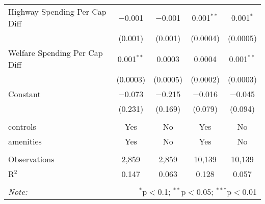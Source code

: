\begin{table}[!htbp]
\begin{tabular}{@{\extracolsep{5pt}}lcccc}
  Highway Spending Per Cap Diff & $-$0.001 & $-$0.001 & 0.001$^{**}$ & 0.001$^{*}$ \\ 
  & (0.001) & (0.001) & (0.0004) & (0.0005) \\ 
  Welfare Spending Per Cap Diff & 0.001$^{**}$ & 0.0003 & 0.0004 & 0.001$^{**}$ \\ 
  & (0.0003) & (0.0005) & (0.0002) & (0.0003) \\ 
  Constant & $-$0.073 & $-$0.215 & $-$0.016 & $-$0.045 \\ 
  & (0.231) & (0.169) & (0.079) & (0.094) \\ 
 \hline \\[-1.8ex] 
controls & Yes & No & Yes & No \\ 
amenities & Yes & No & Yes & No \\ 
\hline \\[-1.8ex] 
Observations & 2,859 & 2,859 & 10,139 & 10,139 \\ 
R$^{2}$ & 0.147 & 0.063 & 0.128 & 0.057 \\ 
\hline 
\hline \\[-1.8ex] 
\textit{Note:}  & \multicolumn{4}{r}{$^{*}$p$<$0.1; $^{**}$p$<$0.05; $^{***}$p$<$0.01} \\ 
\end{tabular} 
\end{table} 
